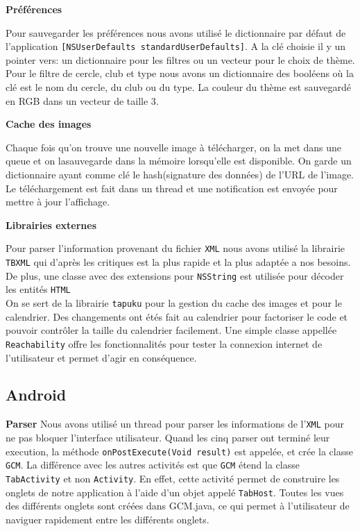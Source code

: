 \documentclass[a4paper, 11px]{article}
\begin{document}
{\bf Préférences}

Pour sauvegarder les préférences nous avons utilisé le dictionnaire par défaut de l'application 
\texttt{[NSUserDefaults standardUserDefaults]}. A la clé choisie il y un pointer vers: un dictionnaire pour les filtres ou un vecteur pour le choix de thème. Pour le filtre de cercle, club et type nous avons un dictionnaire des booléens où la clé est le nom du cercle, du club ou du type. La couleur du thème est sauvegardé en RGB dans un vecteur de taille 3. 
 
{\bf Cache des images}

Chaque fois qu'on trouve une nouvelle image à télécharger, on la met dans une queue et on lasauvegarde dans la mémoire lorsqu'elle est disponible. On garde un dictionnaire ayant comme clé le hash(signature des données) de l'URL de l'image. Le téléchargement est fait dans un thread et une notification est envoyée pour mettre à jour l'affichage.

{\bf Librairies externes}

Pour parser l'information provenant du fichier \texttt{XML} nous avons utilisé la librairie \texttt{TBXML} qui d'après les critiques est la plus rapide et la plus adaptée a nos besoins. De plus, une classe avec des extensions pour \texttt{NSString} est utilisée pour décoder les entités \texttt{HTML}\\
\indent On se sert de la librairie \texttt{tapuku} pour la gestion du cache des images et pour le calendrier. Des changements ont étés fait au calendrier pour factoriser le code et pouvoir contrôler la taille du calendrier facilement.
Une simple classe appellée \texttt{Reachability} offre les fonctionnalités pour tester la connexion internet de l'utilisateur et permet d'agir en conséquence.


\subsection{Android}
{\bf Parser}
Nous avons utilisé un thread pour parser les informations de l'\texttt{XML} pour ne pas bloquer l'interface utilisateur. Quand les cinq parser ont terminé leur execution, la méthode \texttt{onPostExecute(Void result)} est appelée, et crée la classe \texttt{GCM}. La différence avec les autres activités est que \texttt{GCM} étend la classe \texttt{TabActivity} et non \texttt{Activity}. En effet, cette activité permet de construire les onglets de notre application à l'aide d'un objet appelé \texttt{TabHost}. Toutes les vues des différents onglets sont créées dans GCM.java, ce qui permet à l'utilisateur de naviguer rapidement entre les différents onglets.
\end{document}
